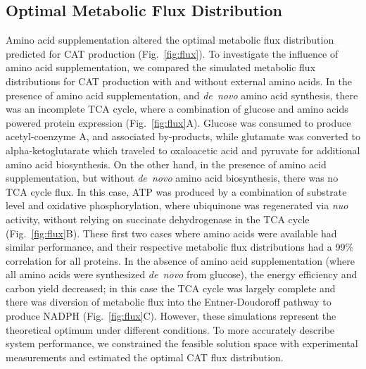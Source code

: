 \documentclass[journal=asbcd6,manuscript=article]{achemso}
\begin{document}
\subsection{Optimal Metabolic Flux Distribution}
Amino acid supplementation altered the optimal metabolic flux distribution predicted for CAT production (Fig.~\ref{fig:flux}).
To investigate the influence of amino acid supplementation, we compared the simulated metabolic flux distributions for CAT production with and without external amino acids.
In the presence of amino acid supplementation, and \textit{de~novo} amino acid synthesis, there was an incomplete TCA cycle, where a combination
of glucose and amino acids powered protein expression (Fig.~\ref{fig:flux}A).
Glucose was consumed to produce acetyl-coenzyme A, and associated by-products,
while glutamate was converted to alpha-ketoglutarate which traveled to oxaloacetic acid and pyruvate for additional amino acid biosynthesis.
On the other hand, in the presence of amino acid supplementation, but without \textit{de~novo} amino acid biosynthesis, there was no TCA cycle flux.
In this case, ATP was produced by a combination of substrate level and oxidative phosphorylation, where
ubiquinone was regenerated via \textit{nuo} activity, without relying on succinate dehydrogenase in the TCA cycle (Fig.~\ref{fig:flux}B).
These first two cases where amino acids were available had similar performance, and their respective metabolic flux distributions had a 99\% correlation for all proteins.
In the absence of amino acid supplementation (where all amino acids were synthesized \textit{de~novo} from glucose),
the energy efficiency and carbon yield decreased; in this case the TCA cycle was largely complete and there was diversion of metabolic flux into the Entner-Doudoroff pathway to produce NADPH (Fig.~\ref{fig:flux}C).
However, these simulations represent the theoretical optimum under different conditions.
To more accurately describe system performance, we constrained the feasible solution space with experimental measurements
and estimated the optimal CAT flux distribution.
\end{document}
